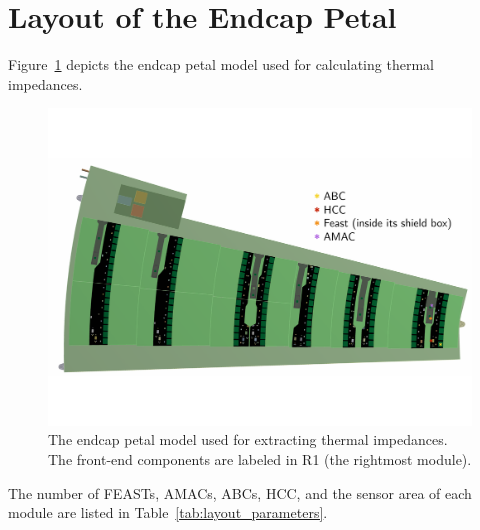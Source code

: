 
\section{Layout of the Endcap Petal}

Figure~\ref{endcap_model} depicts the endcap petal model used for calculating thermal impedances.

\begin{figure}[ht!]
\begin{center}
\includegraphics[width=0.99\linewidth]{figures/m30C_0Wm2C_Setup.pdf}
\end{center}
\caption{The endcap petal model used for extracting thermal impedances. The front-end components are
labeled in R1 (the rightmost module).}
\label{endcap_model}
\end{figure}

The number of FEASTs, AMACs, ABCs, HCC, and the sensor area of each module are listed in
Table~\ref{tab:layout_parameters}.
%
\let\arraystretcha\arraystretch
\renewcommand\arraystretch{1.1} %
\begin{table}[h]
\footnotesize
\begin{center}
\end{center}
\caption{Number of components on each module.}
\label{tab:layout_parameters}
\end{table}
\let\arraystretch\arraystretcha

